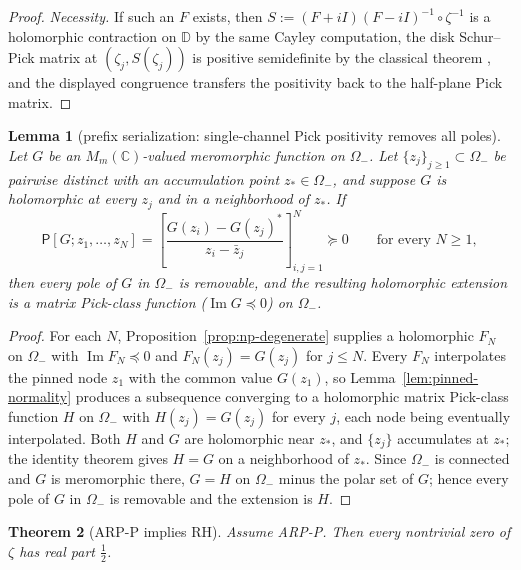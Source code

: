 \documentclass[11pt]{amsart}
\newtheorem{theorem}{Theorem}[section]
\newtheorem{lemma}[theorem]{Lemma}
\theoremstyle{definition}
\theoremstyle{remark}
\theoremstyle{definition}
\renewcommand{\Im}{\operatorname{Im}}
\newcommand{\half}{\tfrac{1}{2}}
\newcommand{\C}{\mathbb{C}}
\begin{document}
\begin{proof}
\emph{Necessity.}  If such an $F$ exists, then $S:=(F+iI)(F-iI)^{-1}\circ\zeta^{-1}$ is a holomorphic
contraction on $\mathbb D$ by the same Cayley computation, the disk Schur--Pick matrix at
$(\zeta_j,S(\zeta_j))$ is positive semidefinite by the classical theorem
\cite{FoiasFrazho}, and the displayed congruence transfers the positivity back to the half-plane Pick
matrix.
\end{proof}

\begin{lemma}[prefix serialization: single-channel Pick positivity removes all poles]\label{lem:prefix-extension}
Let $G$ be an $M_m(\C)$-valued meromorphic function on $\Omega_-$.  Let $\{z_j\}_{j\ge1}\subset\Omega_-$
be pairwise distinct with an accumulation point $z_*\in\Omega_-$, and suppose $G$ is holomorphic at every
$z_j$ and in a neighborhood of $z_*$.  If
\[
   \mathsf P[G;z_1,\ldots,z_N]
   =
   \left[\frac{G(z_i)-G(z_j)^*}{z_i-\bar z_j}\right]_{i,j=1}^N
   \succeq0
   \qquad\text{for every }N\ge1,
\]
then every pole of $G$ in $\Omega_-$ is removable, and the resulting holomorphic extension is a matrix
Pick-class function ($\Im G\preceq0$) on $\Omega_-$.
\end{lemma}

\begin{proof}
For each $N$, Proposition~\ref{prop:np-degenerate} supplies a holomorphic $F_N$ on $\Omega_-$ with
$\Im F_N\preceq0$ and $F_N(z_j)=G(z_j)$ for $j\le N$.  Every $F_N$ interpolates the pinned node $z_1$
with the common value $G(z_1)$, so Lemma~\ref{lem:pinned-normality} produces a subsequence converging to
a holomorphic matrix Pick-class function $H$ on $\Omega_-$ with $H(z_j)=G(z_j)$ for every $j$, each node
being eventually interpolated.  Both $H$ and $G$ are holomorphic near $z_*$, and $\{z_j\}$ accumulates at
$z_*$; the identity theorem gives $H=G$ on a neighborhood of $z_*$.  Since $\Omega_-$ is connected and
$G$ is meromorphic there, $G=H$ on $\Omega_-$ minus the polar set of $G$; hence every pole of $G$ in
$\Omega_-$ is removable and the extension is $H$.
\end{proof}

\begin{theorem}[ARP-P implies RH]\label{thm:pick-rh}
Assume ARP-P.  Then every nontrivial zero of $\zeta$ has real part $\half$.
\end{theorem}
\end{document}
